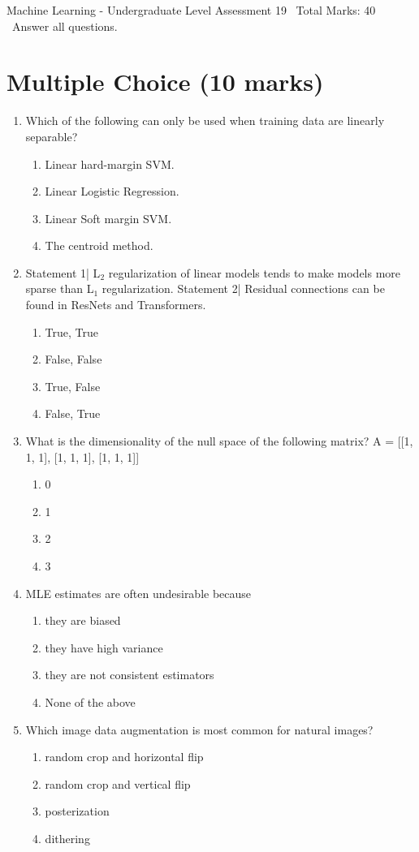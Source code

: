 \documentclass[12pt]{article}
\begin{document}
\begin{center}
Machine Learning - Undergraduate Level Assessment 19 \
Total Marks: 40 \
Answer all questions.
\end{center}

\section*{Multiple Choice (10 marks)}
\begin{enumerate}[label=\arabic*.]
\item Which of the following can only be used when training data are linearly separable?
\begin{enumerate}[label=(\alph*)]
    \item Linear hard-margin SVM.
    \item Linear Logistic Regression.
    \item Linear Soft margin SVM.
    \item The centroid method.
\end{enumerate}
\item Statement 1| L$_{2}$ regularization of linear models tends to make models more sparse than L$_{1}$ regularization. Statement 2| Residual connections can be found in ResNets and Transformers.
\begin{enumerate}[label=(\alph*)]
    \item True, True
    \item False, False
    \item True, False
    \item False, True
\end{enumerate}
\item What is the dimensionality of the null space of the following matrix? A = [[1, 1, 1], [1, 1, 1], [1, 1, 1]]
\begin{enumerate}[label=(\alph*)]
    \item 0
    \item 1
    \item 2
    \item 3
\end{enumerate}
\item MLE estimates are often undesirable because
\begin{enumerate}[label=(\alph*)]
    \item they are biased
    \item they have high variance
    \item they are not consistent estimators
    \item None of the above
\end{enumerate}
\item Which image data augmentation is most common for natural images?
\begin{enumerate}[label=(\alph*)]
    \item random crop and horizontal flip
    \item random crop and vertical flip
    \item posterization
    \item dithering
\end{enumerate}
\end{enumerate}
\end{document}
